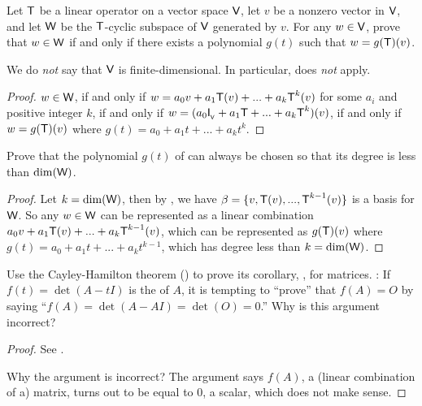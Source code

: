 \begin{exercise} \label{exercise 5.4.13}
Let \(\textsf{T}\) be a linear operator on a vector space \(\textsf{V}\), let \(v\) be a nonzero vector in \(\textsf{V}\), and let \(\textsf{W}\) be the \(\textsf{T}\)-cyclic subspace of \(\textsf{V}\) generated by \(v\).
For any \(w \in \textsf{V}\), prove that \(w \in \textsf{W}\) if and only if there exists a polynomial \(g(t)\) such that \(w = g(\textsf{T})(v)\).
\end{exercise}

\begin{note}
We do \emph{not} say that \(\textsf{V}\) is finite-dimensional.
In particular,  does \emph{not} apply.
\end{note}

\begin{proof}
\(w \in \textsf{W}\), if and only if \(w = a_0 v + a_1 \textsf{T}(v) + ... + a_k \textsf{T}^k(v)\) for some \(a_i\) and positive integer \(k\),
if and only if \(w = (a_0 \textsf{I}_{_{\textsf{V}}}{} + a_1 \textsf{T} + ... + a_k \textsf{T}^k)(v)\), if and only if \(w = g(\textsf{T})(v)\) where \(g(t) = a_0 + a_1 t + ... + a_k t^k\).
\end{proof}

\begin{exercise} \label{exercise 5.4.14}
Prove that the polynomial \(g(t)\) of  can always be chosen so that its degree is less than \(\dim(\textsf{W})\).
\end{exercise}

\begin{proof}
Let \(k = \dim(\textsf{W})\), then by , we have \(\beta = \{ v, \textsf{T}(v), ..., \textsf{T}^{k - 1}(v) \}\) is a basis for \(\textsf{W}\).
So any \(w \in \textsf{W}\) can be represented as a linear combination \(a_0 v + a_1 \textsf{T}(v) + ... + a_k \textsf{T}^{k - 1}(v)\), which can be represented as \(g(\textsf{T})(v)\) where \(g(t) = a_0 + a_1 t + ... + a_k t^{k - 1}\), which has degree less than \(k = \dim(\textsf{W})\).
\end{proof}

\begin{exercise} \label{exercise 5.4.15}
Use the Cayley-Hamilton theorem () to prove its corollary, , for matrices.
: If \(f(t) = \det(A - tI)\) is the \CPOLY{} of \(A\), it is tempting to ``prove'' that \(f(A) = O\) by saying ``\(f(A) = \det(A - AI) = \det(O) = 0\).''
Why is this argument incorrect?
\end{exercise}

\begin{proof}
See .

Why the argument is incorrect? The argument says \(f(A)\), a (linear combination of a) matrix, turns out to be equal to \(0\), a scalar, which does not make sense.
\end{proof}

